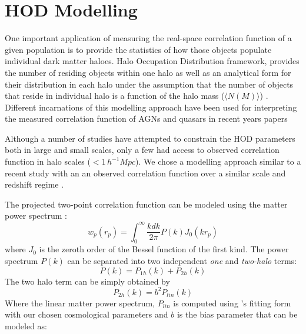 \documentclass[useAMS,usenatbib]{mn2e}
\begin{document}
\section{HOD Modelling}\label{hodmod}

One important application of measuring the real-space correlation function of a 
given population is to provide the statistics of how those objects populate 
individual dark matter haloes.  Halo Occupation Distribution framework, provides 
the number of residing objects within one halo as well as an analytical form for 
their distribution in each halo under the assumption that the number of objects 
that reside in individual halo is a function of the halo mass ($\langle 
N(M)\rangle$) \citep{pea00,sel00,sc01}. Different incarnations of this modelling 
approach have been used for interpreting the measured correlation function of 
AGNs and quasars in recent years \citep[see, e.g., 
][]{po04,Aba05,mi11,ric12,ko12,kru12,ric13,sh13}  %
papers   

Although a number of studies have attempted to constrain the HOD parameters both 
in large and small scales, only a few had access to observed correlation 
function in halo scales ($<1 \, h^{-1} Mpc$). We chose a modelling approach 
similar to a recent study with an an observed correlation function over a 
similar scale and redshift regime \citep{ko12}.  

The projected two-point correlation function can be modeled using the matter 
power spectrum \citep[see, e.g., ][]{cs02}:
\begin{equation}
w_{p}(r_p) = \int^{\infty}_{0} \frac{k dk}{2\pi} P(k) J_0(k r_p)
\end{equation}
where $J_0$ is the zeroth order of the Bessel function of the first kind. The power spectrum $P(k)$ can be separated into two independent {\it one} and {\it two-halo} terms: 
\begin{equation}
  P(k) = P_{1h}(k)+P_{2h}(k)
\end{equation}
The two halo term can be simply obtained by  
\begin{equation}
P_{2h}(k) = b^2 P_{lin}(k)
\end{equation}
Where the linear matter power spectrum, $P_{lin}$ is computed using 
\citet{eh99}'s fitting form with our chosen cosmological parameters and $b$ is 
the bias parameter that can be modeled as:

\end{document}
